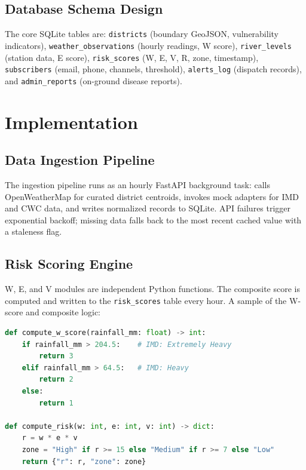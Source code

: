 \documentclass[12pt,a4paper]{report}
\begin{document}
\subsection{Database Schema Design}

The core SQLite tables are: \texttt{districts} (boundary GeoJSON, vulnerability indicators), \texttt{weather\_observations} (hourly readings, W score), \texttt{river\_levels} (station data, E score), \texttt{risk\_scores} (W, E, V, R, zone, timestamp), \texttt{subscribers} (email, phone, channels, threshold), \texttt{alerts\_log} (dispatch records), and \texttt{admin\_reports} (on-ground disease reports).

\section{Implementation}

\subsection{Data Ingestion Pipeline}

The ingestion pipeline runs as an hourly FastAPI background task: calls OpenWeatherMap for curated district centroids, invokes mock adapters for IMD and CWC data, and writes normalized records to SQLite. API failures trigger exponential backoff; missing data falls back to the most recent cached value with a staleness flag.

\subsection{Risk Scoring Engine}

W, E, and V modules are independent Python functions. The composite score is computed and written to the \texttt{risk\_scores} table every hour. A sample of the W-score and composite logic:

\begin{lstlisting}[language=Python, caption=Risk Score Computation Core Logic]
def compute_w_score(rainfall_mm: float) -> int:
    if rainfall_mm > 204.5:    # IMD: Extremely Heavy
        return 3
    elif rainfall_mm > 64.5:   # IMD: Heavy
        return 2
    else:
        return 1

def compute_risk(w: int, e: int, v: int) -> dict:
    r = w * e * v
    zone = "High" if r >= 15 else "Medium" if r >= 7 else "Low"
    return {"r": r, "zone": zone}
\end{lstlisting}
\end{document}
